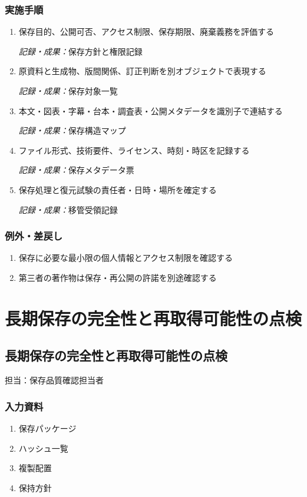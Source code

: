 \documentclass[a4paper,11pt]{article}
\begin{document}
\subsubsection*{実施手順}
\begin{enumerate}[leftmargin=2em,itemsep=0.65em]
\item 保存目的、公開可否、アクセス制限、保存期限、廃棄義務を評価する\par\noindent\textit{記録・成果：}保存方針と権限記録\nobreak\smallskip
\item 原資料と生成物、版間関係、訂正判断を別オブジェクトで表現する\par\noindent\textit{記録・成果：}保存対象一覧\nobreak\smallskip
\item 本文・図表・字幕・台本・調査表・公開メタデータを識別子で連結する\par\noindent\textit{記録・成果：}保存構造マップ\nobreak\smallskip
\item ファイル形式、技術要件、ライセンス、時刻・時区を記録する\par\noindent\textit{記録・成果：}保存メタデータ票\nobreak\smallskip
\item 保存処理と復元試験の責任者・日時・場所を確定する\par\noindent\textit{記録・成果：}移管受領記録\nobreak\smallskip
\end{enumerate}
\subsubsection*{例外・差戻し}
\begin{enumerate}[leftmargin=2em,itemsep=0.35em]
\item 保存に必要な最小限の個人情報とアクセス制限を確認する
\item 第三者の著作物は保存・再公開の許諾を別途確認する
\end{enumerate}
\section{長期保存の完全性と再取得可能性の点検}
\subsection{長期保存の完全性と再取得可能性の点検}
\par 担当：保存品質確認担当者\par\medskip
\subsubsection*{入力資料}
\begin{enumerate}[leftmargin=2em,itemsep=0.35em]
\item 保存パッケージ
\item ハッシュ一覧
\item 複製配置
\item 保持方針
\end{enumerate}
\end{document}
